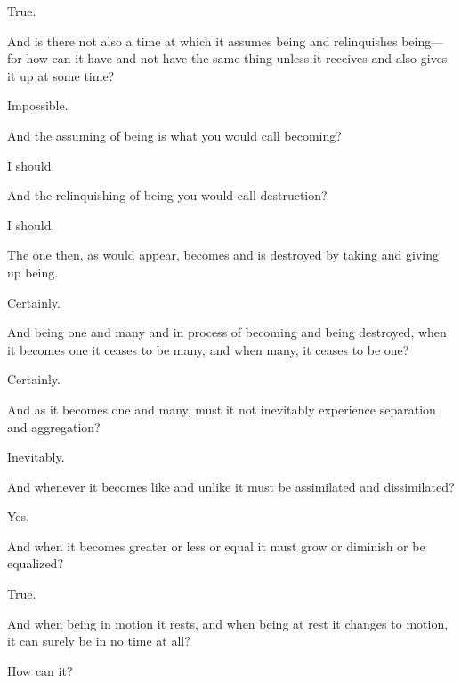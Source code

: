 \documentclass[11pt,letter]{article}
\begin{document}
\par  True.

\par  And is there not also a time at which it assumes being and relinquishes being—for how can it have and not have the same thing unless it receives and also gives it up at some time?

\par  Impossible.

\par  And the assuming of being is what you would call becoming?

\par  I should.

\par  And the relinquishing of being you would call destruction?

\par  I should.

\par  The one then, as would appear, becomes and is destroyed by taking and giving up being.

\par  Certainly.

\par  And being one and many and in process of becoming and being destroyed, when it becomes one it ceases to be many, and when many, it ceases to be one?

\par  Certainly.

\par  And as it becomes one and many, must it not inevitably experience separation and aggregation?

\par  Inevitably.

\par  And whenever it becomes like and unlike it must be assimilated and dissimilated?

\par  Yes.

\par  And when it becomes greater or less or equal it must grow or diminish or be equalized?

\par  True.

\par  And when being in motion it rests, and when being at rest it changes to motion, it can surely be in no time at all?

\par  How can it?
\end{document}
